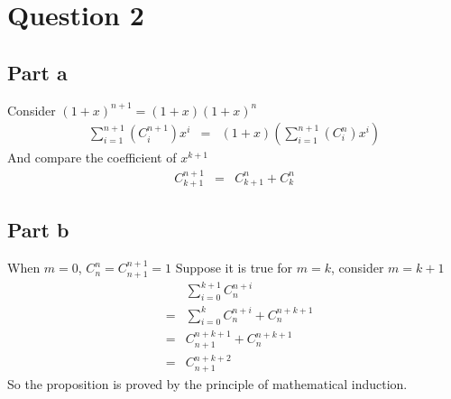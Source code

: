 \section*{Question 2}
\subsection*{Part a}
Consider $ (1 + x)^{n+1} = (1 + x)(1 + x)^n $ 
\begin{eqnarray*}
  \sum\limits_{i=1}^{n+1}(C^{n+1}_i)x^i &=& (1 + x)(\sum\limits_{i=1}^{n+1}(C^{n}_i)x^i)
\end{eqnarray*}
And compare the coefficient of $ x^{k+1} $
\begin{eqnarray*}
  C^{n+1}_{k+1} &=& C^n_{k+1} + C^n_k
\end{eqnarray*}
\subsection*{Part b}
When $ m = 0 $, $ C^n_n = C^{n+1}_{n+1} = 1 $
Suppose it is true for $ m = k $, consider $ m = k + 1 $
\begin{eqnarray*}
  & & \sum\limits_{i = 0}^{k+1}C^{n+i}_n \\
  &=& \sum\limits_{i = 0}^k C^{n+i}_n + C^{n+k+1}_n \\
  &=& C^{n+k+1}_{n+1} + C^{n+k+1}_n \\
  &=& C^{n+k+2}_{n+1}
\end{eqnarray*}
So the proposition is proved by the principle of mathematical induction.